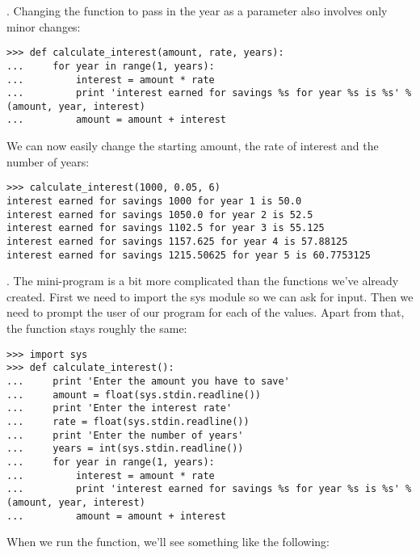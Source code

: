 . Changing the function to pass in the year as a parameter also involves only minor changes:

\begin{listing}
\begin{verbatim}
>>> def calculate_interest(amount, rate, years):
...     for year in range(1, years):
...         interest = amount * rate
...         print 'interest earned for savings %s for year %s is %s' % (amount, year, interest)
...         amount = amount + interest
\end{verbatim}
\end{listing}

\noindent
We can now easily change the starting amount, the rate of interest and the number of years:

\begin{listing}
\begin{verbatim}
>>> calculate_interest(1000, 0.05, 6)
interest earned for savings 1000 for year 1 is 50.0
interest earned for savings 1050.0 for year 2 is 52.5
interest earned for savings 1102.5 for year 3 is 55.125
interest earned for savings 1157.625 for year 4 is 57.88125
interest earned for savings 1215.50625 for year 5 is 60.7753125
\end{verbatim}
\end{listing}

. The mini-program is a bit more complicated than the functions we've already created.  First we need to import the sys module so we can ask for input.  Then we need to prompt the user of our program for each of the values.  Apart from that, the function stays roughly the same:

\begin{listing}
\begin{verbatim}
>>> import sys
>>> def calculate_interest():
...     print 'Enter the amount you have to save'
...     amount = float(sys.stdin.readline())
...     print 'Enter the interest rate'
...     rate = float(sys.stdin.readline())
...     print 'Enter the number of years'
...     years = int(sys.stdin.readline())
...     for year in range(1, years):
...         interest = amount * rate
...         print 'interest earned for savings %s for year %s is %s' % (amount, year, interest)
...         amount = amount + interest
\end{verbatim}
\end{listing}

\noindent
When we run the function, we'll see something like the following:

